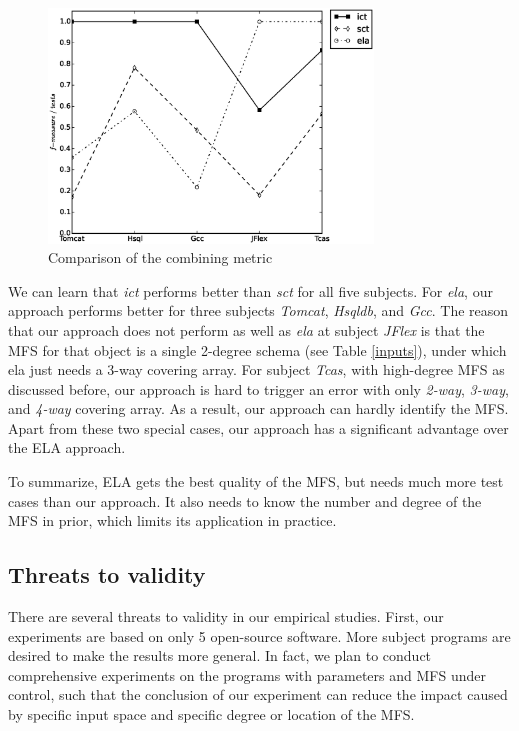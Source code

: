 \documentclass{sig-alternate}
\begin{document}
\begin{figure}[htbp]
 \includegraphics[width=3.4in]{result.eps}
\caption{Comparison of the combining metric}
\label{cm_performance}
\end{figure}

We can learn that \emph{ict} performs better than \emph{sct} for all five subjects.  For \emph{ela}, our approach performs better for three subjects \emph{Tomcat}, \emph{Hsqldb}, and \emph{Gcc}. The reason that our approach does not perform as well as \emph{ela} at subject \emph{JFlex} is that the MFS for that object is a single 2-degree schema (see Table \ref{inputs}), under which ela just needs a 3-way covering array.  For subject \emph{Tcas}, with high-degree MFS as discussed before, our approach is hard to trigger an error with only \emph{2-way}, \emph{3-way}, and \emph{4-way} covering array. As a result, our approach can hardly identify the MFS. Apart from these two special cases, our approach has a significant advantage over the ELA approach.

To summarize, ELA gets the best quality of the MFS, but needs much more test cases than our approach.  It also needs to know the number and degree of the MFS in prior, which limits its application in practice.
%



\subsection{Threats to validity}

There are several threats to validity in our empirical studies. First, our experiments are based on only 5 open-source software. More subject programs are desired to make the results more general. In fact, we plan to conduct comprehensive experiments on the programs with parameters and MFS under control, such that the conclusion of our experiment can reduce the impact caused by specific input space and specific degree or location of the MFS.
\end{document}
